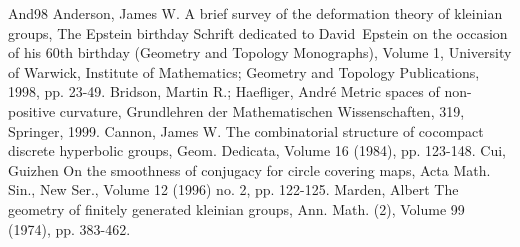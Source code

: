 \begin{thebibliography}{And98}
 Anderson, James W. A brief survey of the deformation theory of kleinian groups, The Epstein birthday Schrift dedicated to David Epstein on the occasion of his 60th birthday (Geometry and Topology Monographs), Volume 1, University of Warwick, Institute of Mathematics; Geometry and Topology Publications, 1998, pp. 23-49.
 Bridson, Martin R.; Haefliger, André Metric spaces of non-positive curvature, Grundlehren der Mathematischen Wissenschaften, 319, Springer, 1999.
 Cannon, James W. The combinatorial structure of cocompact discrete hyperbolic groups, Geom. Dedicata, Volume 16 (1984), pp. 123-148.
 Cui, Guizhen On the smoothness of conjugacy for circle covering maps, Acta Math. Sin., New Ser., Volume 12 (1996) no. 2, pp. 122-125.
 Marden, Albert The geometry of finitely generated kleinian groups, Ann. Math. (2), Volume 99 (1974), pp. 383-462.
\end{thebibliography}
